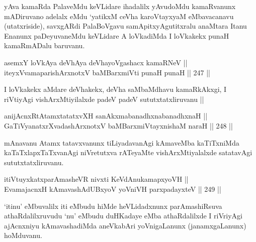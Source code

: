 \begin{artha}
yAva kamaRda PalaveMdu keVLidare ihadalilx yAvudoMdu kamaRvanunx
mADiruvano adelalx eMdu `yatikxM ceVha karoVtayxyaM eMbavacanavu
(utatxriside), savxgARdi PalaBoVgavu samApitxyAgutitxralu anaMtara
Itanu Enanunx paDeyuvaneMdu keVLidare A loVkadiMda I loVkakekx punaH
kamaRmADalu baruvanu.
\end{artha}


\begin{shl}
asemxY loVkAya deVhAya deVhayoVgashacx kamaRNeV || \\
iteyxVvamaparishArxnotxV baMBarxmiVti punaH punaH \hfill || 247 ||  
\end{shl}

\begin{artha}
I loVkakekx aMdare deVhakekx, deVha saMbaMdhavu kamaRkAkxgi, I
riVtiyAgi vishArxMtiyilalxde padeV padeV sututxtatxliruvanu || 
\end{artha}


\begin{shl}
anijAcnxRtAtamxtatatxvXH sanAkxmabanadhxnabanadhxnaH || \\
GaTiVyanatxrXvadashArxnotxV baMBarxmiVtayxnishaM naraH \hfill || 248 ||  
\end{shl}

\begin{artha}
mAnavanu Atamx tatavxvanunx tiLiyadavanAgi kAmaveMba kaTiTxniMda
kaTaTxlapxTaTxvanAgi niVretutxva rATeyaMte vishArxMtiyalalxde satatavAgi
sututxtatxliruvanu.
\end{artha}

\begin{shl}
itiVtuyxkatxparAmasheVR nivxti KeVdAnukamapxyoVH || \\
EvamajacnxH kAmavashAdUBxyoV yoVniVH parxpadayxteV \hfill || 249 ||  
\end{shl}

\begin{artha}
`itinu' eMbuvalilx iti eMbudu hiMde heVLidadxnunx parAmashiRsuva
athaRdalilxruvudu `nu' eMbudu duHKadaye eMba athaRdalilxde I riVriyAgi
ajAcnxniyu kAmavashadiMda aneVkabAri yoVnigaLanunx (janamxgaLanunx)
hoMduvanu.
\end{artha}


